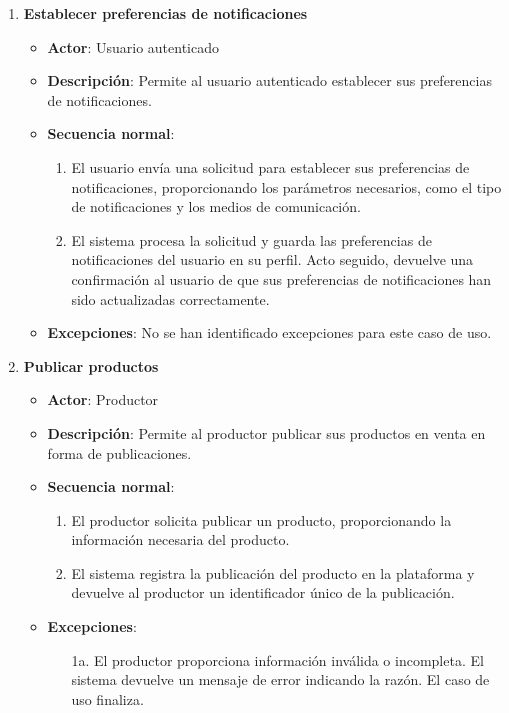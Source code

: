 \begin{enumerate}[label=UC-\protect\twodigits{\arabic*}:, align=left, leftmargin=*]
\item \textbf{Establecer preferencias de notificaciones}
\begin{itemize}
\item \textbf{Actor}: Usuario autenticado
\item \textbf{Descripción}: Permite al usuario autenticado establecer sus preferencias de notificaciones.
\item \textbf{Secuencia normal}:
\begin{enumerate}[label={\arabic*}:]
\item El usuario envía una solicitud para establecer sus preferencias de notificaciones, proporcionando los parámetros necesarios, como el tipo de notificaciones y los medios de comunicación.
\item El sistema procesa la solicitud y guarda las preferencias de notificaciones del usuario en su perfil. Acto seguido, devuelve una confirmación al usuario de que sus preferencias de notificaciones han sido actualizadas correctamente.
\end{enumerate}
\item \textbf{Excepciones}: No se han identificado excepciones para este caso de uso.
\end{itemize}

\item \textbf{Publicar productos}
\begin{itemize}
\item \textbf{Actor}: Productor
\item \textbf{Descripción}: Permite al productor publicar sus productos en venta en forma de publicaciones.
\item \textbf{Secuencia normal}:
\begin{enumerate}[label={\arabic*}:]
\item El productor solicita publicar un producto, proporcionando la información necesaria del producto.
\item El sistema registra la publicación del producto en la plataforma y devuelve al productor un identificador único de la publicación.
\end{enumerate}
\item \textbf{Excepciones}:
\begin{itemize}
\item[1a.] El productor proporciona información inválida o incompleta. El sistema devuelve un mensaje de error indicando la razón. El caso de uso finaliza.
\end{itemize}
\end{itemize}


\end{enumerate}

